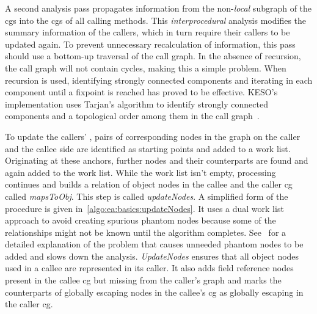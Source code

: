 			A second analysis pass propagates information from the non-\emph{local} subgraph of the \glspl{cg} into the
			\glspl{cg} of all calling methods. This \emph{interprocedural} analysis modifies the summary information of the
			callers, which in turn require their callers to be updated again. To prevent unnecessary recalculation of
			information, this pass should use a bottom-up traversal of the call graph. In the absence of recursion, the call
			graph will not contain cycles, making this a simple problem. When recursion is used, identifying strongly
			connected components and iterating in each component until a fixpoint is reached has proved to be effective.
			KESO's implementation uses Tarjan's algorithm to identify strongly connected components and a topological order
			among them in the call graph~\cite{tarjan:72:lga}.

			To update the callers' , pairs of corresponding nodes in the graph on the caller and the callee side
			are identified as starting points and added to a work list. Originating at these anchors, further nodes and their
			counterparts are found and again added to the work list. While the work list isn't empty, processing continues and
			builds a relation of object nodes in the callee and the caller \gls{cg} called \emph{mapsToObj}. This step is
			called \emph{updateNodes}. A simplified form of the procedure is given in~\cref{algo:ea:basics:updateNodes}. It
			uses a dual work list approach to avoid creating spurious phantom nodes because some of the relationships might
			not be known until the algorithm completes. See~\cite[Sec.~3.2.1]{lang:12} for a detailed explanation of the
			problem that causes unneeded phantom nodes to be added and slows down the analysis. \emph{UpdateNodes} ensures
			that all object nodes used in a callee are represented in its caller. It also adds field reference nodes present
			in the callee \gls{cg} but missing from the caller's graph and marks the counterparts of globally escaping nodes
			in the callee's \gls{cg} as globally escaping in the caller \gls{cg}.

